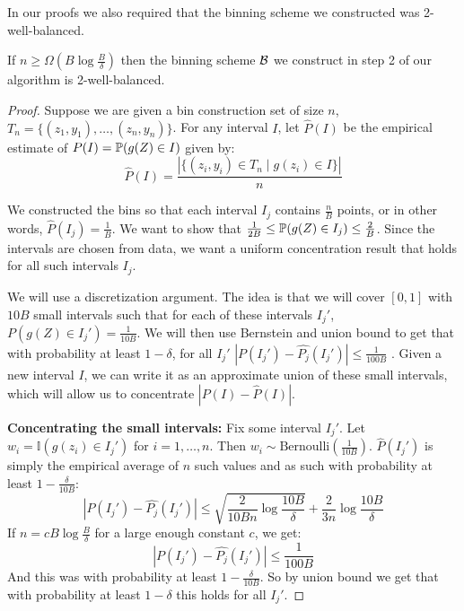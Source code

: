 In our proofs we also required that the binning scheme we constructed was 2-well-balanced.

\begin{lemma}
\label{lem:well-balanced}
If $n \geq \Omega(B \log{\frac{B}{\delta}})$ then the binning scheme $\mathcal{B}{}$ we construct in step 2 of our algorithm is 2-well-balanced.
\end{lemma}

\begin{proof}
Suppose we are given a bin construction set of size $n$, $T_n = \{(z_1, y_1), \dots, (z_n, y_n)\}$.
For any interval $I$, let $\hat{P}(I)$ be the empirical estimate of $P(I) = \mathbb{P}(g(Z) \in I)$ given by:
\[ \hat{P}(I) = \frac{|\{(z_i, y_i) \in T_n \mid g(z_i) \in I\}|}{n} \]

We constructed the bins so that each interval $I_j$ contains $\frac{n}{B}$ points, or in other words, $\hat{P}(I_j) = \frac{1}{B}$. We want to show that $\frac{1}{2B} \leq \mathbb{P}(g(Z) \in I_j) \leq \frac{2}{B}$. Since the intervals are chosen from data, we want a uniform concentration result that holds for all such intervals $I_j$.

We will use a discretization argument. The idea is that we will cover $[0, 1]$ with $10B$ small intervals such that for each of these intervals $I_j'$, $P(g(Z) \in I_j') = \frac{1}{10B}$. We will then use Bernstein and union bound to get that with probability at least $1 - \delta$, for all $I_j'$ $|P(I_j') - \hat{P_j}(I_j')| \leq \frac{1}{100B}$ . Given a new interval $I$, we can write it as an approximate union of these small intervals, which will allow us to concentrate $|P(I) - \hat{P}(I)|$.

\textbf{Concentrating the small intervals:} Fix some interval $I_j'$. Let $w_i = \mathbb{I}(g(z_i) \in I_j')$ for $i = 1,\dots,n$. Then $w_i \sim \mbox{Bernoulli}(\frac{1}{10B})$. $\hat{P}(I_j')$ is simply the empirical average of $n$ such values and as such with probability at least $1 - \frac{\delta}{10B}$:
\[ |P(I_j') - \hat{P_j}(I_j')| \leq \sqrt{\frac{2}{10Bn} \log{\frac{10B}{\delta}}} + \frac{2}{3n} \log{\frac{10B}{\delta}} \]
If $n = cB \log{\frac{B}{\delta}}$ for a large enough constant $c$, we get:
\[ |P(I_j') - \hat{P_j}(I_j')| \leq \frac{1}{100B} \]
And this was with probability at least $1 - \frac{\delta}{10B}$. So by union bound we get that with probability at least $1 - \delta$ this holds for all $I_j'$.


\end{proof}
